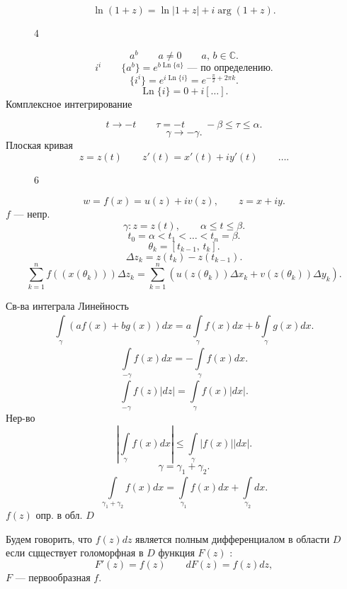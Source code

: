 \[
	\ln(1+z) = \ln |1 +z|+ i \operatorname{arg} (1+z)
.\] 
\begin{figure}[ht]
    \centering
    \caption{4}
    \label{fig:4}
\end{figure}
\[
	a ^{b} \qquad a \neq 0 \qquad a,\,b \in \mathbb{C}
.\] 
\[
i^i \qquad \{a^ b\} = e ^{b \operatorname{Ln} \{a\} } \text{ --- по определению}
.\] 
\[
	\{i^i\} =e ^{i \operatorname{Ln} \{i\} }=e ^{- \frac{\pi}{2}+2 \pi k}
.\] 
\[
	\operatorname{Ln} \{ i\} = 0 + i [\ldots]
.\] 
Комплексное интегрирование
\begin{figure}[ht]
    \centering
    \caption{}
    \label{fig:5}
\end{figure}
\[
t \to -t \qquad \tau = -t \qquad -\beta \le  \tau \le  \alpha
.\] 
\[
\gamma \to -\gamma
.\] 
Плоская кривая
\[
	z = z(t) \qquad z'(t) = x'(t)+ i y'(t)\qquad \ldots
.\] 
\begin{figure}[ht]
    \centering
    \caption{6}
    \label{fig:6}
\end{figure}
\[
	w = f(x) = u (z) + i v(z) , \qquad z = x +i y
.\] 
$f$ --- непр.
 \[
	 \gamma: z = z(t) , \qquad \alpha \le  t \le  \beta
.\] 
\[
t_0= \alpha< t_1 < \ldots < t_n = \beta
.\] 
\[
	\theta_k = [t_{k-1},\,t_k]
.\] 
\[
	\Delta z_k = z(t_k) - z(t_{k-1})
.\] 
\[
	\sum_{k=1}^{n} f\left( \left( x(\theta_k) \right)  \right) \Delta z_k= \sum_{k=1}^{n} \left( u (z(\theta_k))\Delta x_k +
	v ( z(\theta_k)) \Delta y_k \right) 
.\]

Св-ва интеграла
Линейность
\[
	\int\limits_{\gamma}^{} \left( a f(x) + b g (x) \right) dx= a \int\limits_{\gamma}^{} f(x) dx + b \int\limits_{\gamma}^{} g(x)
	dx
.\] 
\[
	\int\limits_{-\gamma}^{} f(x) dx= - \int\limits_{\gamma}^{} f(x) dx  
.\] 
\[
	\int\limits_{-\gamma}^{} f(z) |dz|= \int\limits_{\gamma}^{} f(x) |dx|  
.\] 
Нер-во
\[
	\left| \int\limits_{\gamma}^{} f(x) dx  \right| \le  \int\limits_{\gamma}^{} |f(x)| |dx| 
.\] 
\[
\gamma= \gamma_1 + \gamma_2
.\] 
\[
	\int\limits_{\gamma_1 +\gamma_2}^{} f(x) dx= \int\limits_{\gamma_1}^{} f(x) dx + \int\limits_{\gamma_2}^{} dx   
.\] 
$f(z)$ опр. в обл. $D$ 

Будем говорить, что $f(z)dz$ является полным дифференциалом в области $D$ если сцществует голоморфная в $D$ функция
$F(z)$ :
\[
	F'(z) = f(z) \qquad dF(z)= f(z) dz
 ,\] 
 $F$ --- первообразная $f$.
\sem

